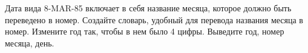 Дата вида 8-MAR-85 включает в себя название месяца, которое должно быть переведено в номер. Создайте словарь, удобный для перевода названия месяца в номер. Измените год так, чтобы в нем было 4 цифры. Выведите год, номер месяца, день.